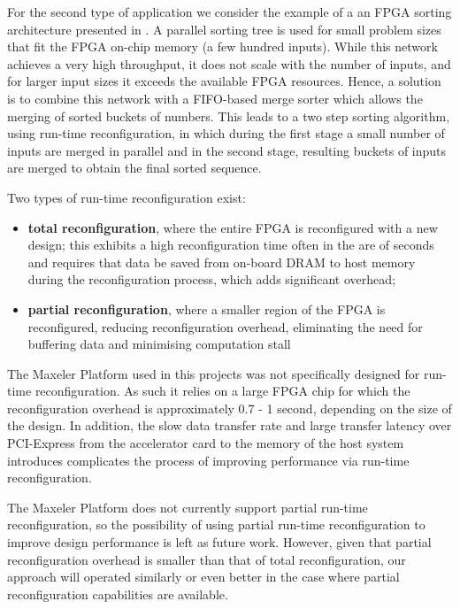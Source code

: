 For the second type of application we consider the example of a an
FPGA sorting architecture presented in \cite{koch2011fpgasort}. A
parallel sorting tree is used for small problem sizes that fit the
FPGA on-chip memory (a few hundred inputs). While this network
achieves a very high throughput, it does not scale with the number of
inputs, and for larger input sizes it exceeds the available FPGA
resources. Hence, a solution is to combine this network with a
FIFO-based merge sorter\cite{marcelino2009unbalanced} which allows the
merging of sorted buckets of numbers. This leads to a two step sorting
algorithm, using run-time reconfiguration, in which during the first
stage a small number of inputs are merged in parallel and in the
second stage, resulting buckets of inputs are merged to obtain the
final sorted sequence.

Two types of run-time reconfiguration exist:
\begin{itemize}
\item \textbf{total reconfiguration}, where the entire FPGA is
  reconfigured with a new design; this exhibits a high reconfiguration
  time often in the are of seconds and requires that data be saved
  from on-board DRAM to host memory during the reconfiguration
  process, which adds significant overhead;
\item \textbf{partial reconfiguration}, where a smaller region of the
  FPGA is reconfigured, reducing reconfiguration overhead, eliminating
  the need for buffering data and minimising computation stall
\end{itemize}

The Maxeler Platform used in this projects was not specifically
designed for run-time reconfiguration. As such it relies on a large
FPGA chip for which the reconfiguration overhead is approximately 0.7
- 1 second, depending on the size of the design. In addition, the slow
data transfer rate and large transfer latency over PCI-Express from
the accelerator card to the memory of the host system introduces
complicates the process of improving performance via run-time
reconfiguration.

The Maxeler Platform does not currently support partial run-time
reconfiguration, so the possibility of using partial run-time
reconfiguration to improve design performance is left as future
work. However, given that partial reconfiguration overhead is smaller
than that of total reconfiguration, our approach will operated
similarly or even better in the case where partial reconfiguration
capabilities are available.

